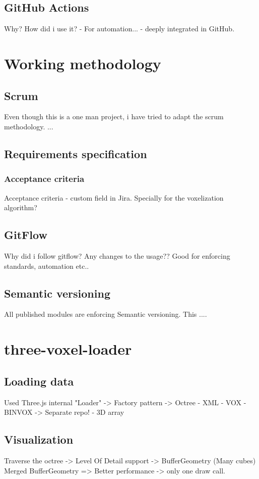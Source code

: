 \subsection{GitHub Actions}
Why? How did i use it? - For automation... - deeply integrated in GitHub.

\section{Working methodology}
\subsection{Scrum}
Even though this is a one man project, i have tried to adapt the scrum methodology.
...

\subsection{Requirements specification}
\subsubsection{Acceptance criteria}
Acceptance criteria - custom field in Jira.
Specially for the voxelization algorithm?

\subsection{GitFlow}
Why did i follow gitflow? Any changes to the usage?? Good for enforcing standards, automation etc..

\subsection{Semantic versioning}
All published modules are enforcing Semantic versioning. This ....

\section{three-voxel-loader}
\subsection{Loading data}
Used Three.js internal "Loader" -> Factory pattern -> Octree
- XML
- VOX
- BINVOX -> Separate repo!
- 3D array

\subsection{Visualization}
Traverse the octree -> Level Of Detail support -> BufferGeometry (Many  cubes)
Merged BufferGeometry => Better performance -> only one draw call.
